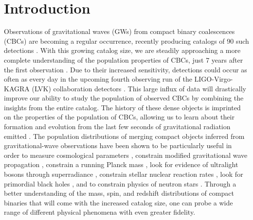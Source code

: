 \section{Introduction} \label{sec:intro}

Observations of gravitational waves (GWs) from compact binary coalescences (CBCs) are becoming a regular occurrence, 
recently producing catalogs of 90 such detections \citep{GWTC1,gwtc2,GWTC3}. With this growing catalog size, we are steadily approaching a more complete  
understanding of the population properties of CBCs, just 7 years after the first observation \citep{o1o2_pop,o3a_pop,o3b_astro_dist}. 
Due to their increased sensitivity, detections could occur as often as every day in the upcoming fourth observing run of the LIGO-Virgo-KAGRA (LVK) collaboration 
detectors \citep{aLIGO,aVIRGO,LVK_prospects}. This large influx of data will drastically improve our ability to study the population of observed CBCs by 
combining the insights from the entire catalog. The history of these dense objects is imprinted on the properties 
of the population  of CBCs, allowing us to learn about their formation and evolution from the last few seconds of gravitational radiation emitted \citep{Zevin_2017}. 
The population distributions of merging compact objects inferred from gravitational-wave observations have been shown to be particularly useful in order to
measure cosmological parameters \citep{Farr_2019HUB,gwtc3_cosmo}, constrain modified gravitational wave propagation \citep{ModGWProp,ModGWProp2}, 
constrain a running Planck mass \citep{Lagos_runningPlanckMass}, look for evidence of ultralight bosons through superradiance \citep{Ng_Boson2021,GWTC2_superradiance_Ng}, 
constrain stellar nuclear reaction rates \citep{Farmer_2019,Farmer_2020}, look for primordial black holes \citep{Ng_2021,KenNgPBH2022}, 
and to constrain physics of neutron stars \citep{Golomb_EOS,LandryRead_NS_Masses2021}. Through a better understanding of the mass, spin, and redshift distributions of 
compact binaries that will come with the increased catalog size, one can probe a wide range of different physical phenomena with even greater fidelity.

